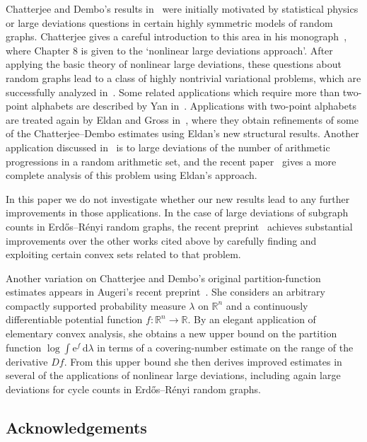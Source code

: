 \documentclass[aop,preprint]{imsart}
\theoremstyle{remark}
\newcommand{\bbR}{\mathbb{R}}
\renewcommand{\d}{\mathrm{d}}
\newcommand{\rme}{\mathrm{e}}
\renewcommand{\l}{\lambda}
\renewcommand{\to}{\longrightarrow}
\begin{document}
Chatterjee and Dembo's results in~\cite{ChaDem16} were initially motivated by statistical physics or large deviations questions in certain highly symmetric models of random graphs.  Chatterjee gives a careful introduction to this area in his monograph~\cite{Cha--randomgraphsbook}, where Chapter 8 is given to the `nonlinear large deviations approach'.  After applying the basic theory of nonlinear large deviations, these questions about random graphs lead to a class of highly nontrivial variational problems, which are successfully analyzed in~\cite{LubZha17,BhaGanLubZha17}. Some related applications which require more than two-point alphabets are described by Yan in~\cite{Yan--nldp}.  Applications with two-point alphabets are treated again by Eldan and Gross in~\cite{Eld--GWcomp,EldGro18,EldGro--exprndmgraphs}, where they obtain refinements of some of the Chatterjee--Dembo estimates using Eldan's new structural results.  Another application discussed in~\cite{ChaDem16} is to large deviations of the number of arithmetic progressions in a random arithmetic set, and the recent paper~\cite{BhaGanShaZha--APs} gives a more complete analysis of this problem using Eldan's approach.

In this paper we do not investigate whether our new results lead to any further improvements in those applications.  In the case of large deviations of subgraph counts in Erd\H{o}s--R\'enyi random graphs, the recent preprint~\cite{DemCoo--subgraphuppertail}
achieves substantial improvements over the other works cited above by carefully finding and exploiting certain convex sets related to that problem.

Another variation on Chatterjee and Dembo's original partition-function estimates appears in Augeri's recent preprint~\cite{Aug--NLDP}.  She considers an arbitrary compactly supported probability measure $\l$ on $\bbR^n$ and a continuously differentiable potential function $f:\bbR^n\to\bbR$.  By an elegant application of elementary convex analysis, she obtains a new upper bound on the partition function $\log \int \rme^f\,\d\l$ in terms of a covering-number estimate on the range of the derivative $Df$.  From this upper bound she then derives improved estimates in several of the applications of nonlinear large deviations, including again large deviations for cycle counts in Erd\H{o}s--R\'enyi random graphs.





\subsection*{Acknowledgements}
\end{document}
